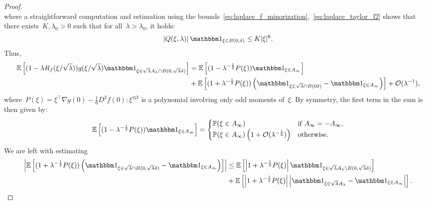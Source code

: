 \documentclass[10pt]{article}
\newcommand{\E}{\mathbb{E}}
\renewcommand{\P}{\mathbb{P}}
\newcommand{\1}{\mathbbm 1}
\renewcommand{\O}{\mathcal{O}}
\begin{document}
\begin{proof}
\begin{equation}
            \end{equation}
            where a straightforward computation and estimation using the bounds~\eqref{eq:laplace_f_minorization},~\eqref{eq:laplace_taylor_f2} shows that there exists~$K,\lambda_0 >0$ such that for all~$\lambda>\lambda_0$, it holds:
            \begin{equation}
                \left|Q(\xi,\lambda)\right|\1_{\xi\in B(0,\delta)} \leq K|\xi|^6.
            \end{equation}
            Thus,
            \begin{equation}
            \begin{aligned}
                \E\left[(1-\lambda R_f(\xi/\sqrt\lambda))g(\xi/\sqrt\lambda)\1_{\xi \in \sqrt\lambda A_\lambda \cap B(0,\sqrt\lambda \delta)}\right] &= \E\left[(1-\lambda^{-\frac12}P(\xi))\1_{\xi\in A_\infty}\right]\\ 
                &+ \E\left[(1+\lambda^{-\frac12}P(\xi))\left(\1_{\xi\in\sqrt\lambda \cap B(0\delta)}-\1_{\xi\in A_\infty}\right)\right] + \O(\lambda^{-1}),
            \end{aligned}
            \end{equation}
            where~$P(\xi) = \xi^\intercal \nabla g(0)-\frac16 D^3 f(0):\xi^{\otimes 3}$ is a polynomial involving only odd moments of~$\xi$. By symmetry, the first term in the sum is then given by:
            \begin{equation}
                \label{eq:laplace_error_b}
                \E\left[(1-\lambda^{-\frac12}P(\xi))\1_{\xi\in A_\infty}\right] = \begin{cases}
                    \P(\xi \in A_\infty)&\text{if } A_\infty = - A_\infty,\\
                    \P(\xi\in A_\infty)\left(1+\O(\lambda^{-\frac12})\right)&\text{otherwise.}
                \end{cases}
            \end{equation}
            We are left with estimating
            \begin{equation}
                \begin{aligned}
                    \left|\E\left[(1+\lambda^{-\frac12}P(\xi))\left(\1_{\xi\in\sqrt\lambda \cap B(0,\sqrt\lambda\delta)}-\1_{\xi\in A_\infty}\right)\right]\right| &\leq \E\left[\left|1 + \lambda^{-\frac12}P(\xi)\right|\1_{\xi\in\sqrt\lambda A_\lambda \setminus B(0,\sqrt\lambda\delta)}\right]\\
                    &+ \E\left[\left|1 + \lambda^{-\frac12}P(\xi)\right|\left|\1_{\xi \in \sqrt\lambda A_\lambda}-\1_{\xi \in A_\infty}\right|\right].
                \end{aligned}
            \end{equation}


\end{proof}
\end{document}
